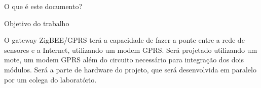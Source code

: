 O que \'e este documento?

Objetivo do trabalho




O gateway ZigBEE/GPRS ter\'a a capacidade de fazer a ponte entre a rede de sensores e a Internet, utilizando um modem GPRS. Ser\'a projetado utilizando um mote, um modem GPRS al\'em do circuito necess\'ario para integra\c{c}\~ao dos dois m\'odulos. Ser\'a a parte de hardware do projeto, que ser\'a desenvolvida em paralelo por um colega do laborat\'orio.

